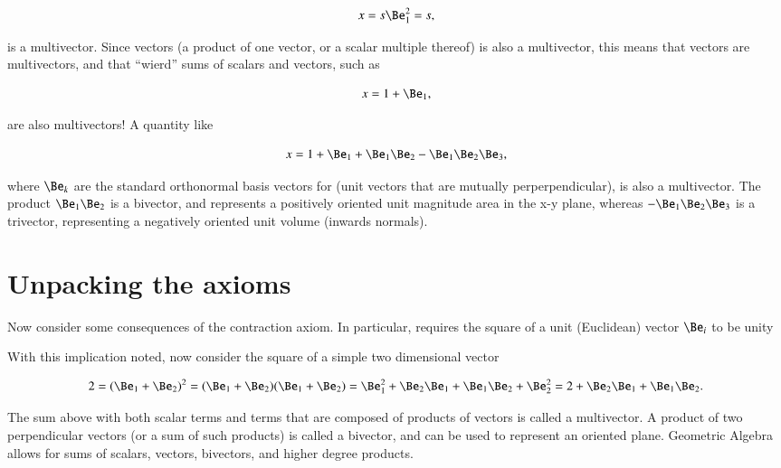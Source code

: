\begin{equation}\label{eqn:multivector:20}
   x = s \Be_1^2 = s,
\end{equation}

is a multivector.  Since vectors (a product of one vector, or a scalar multiple thereof) is also a multivector, this
means that vectors are multivectors, and that ``wierd'' sums of scalars and vectors, such as

\begin{dmath}\label{eqn:multivector:40}
   x = 1 + \Be_1,
\end{dmath}

are also multivectors!  A quantity like

\begin{dmath}\label{eqn:multivector:40}
   x = 1 + \Be_1 + \Be_1 \Be_2 - \Be_1 \Be_2 \Be_3,
\end{dmath}

where \( \Be_k \) are the standard orthonormal basis vectors for  (unit vectors that are mutually perperpendicular), is also a multivector.  The product \( \Be_1 \Be_2 \) is a bivector, and represents a positively oriented unit magnitude area in the x-y plane, whereas \( - \Be_1 \Be_2 \Be_3 \) is a trivector, representing a negatively oriented unit volume (inwards normals).

\section{Unpacking the axioms}
Now consider some consequences of the contraction axiom.  In particular,
requires the square of a unit (Euclidean) vector \( \Be_i \) to be unity


With this implication noted, now consider the square of a simple two dimensional vector

\begin{dmath}\label{eqn:gaTutorial:80}
2
=
(\Be_1 + \Be_2)^2
= (\Be_1 + \Be_2)(\Be_1 + \Be_2)
= \Be_1^2 + \Be_2 \Be_1 + \Be_1 \Be_2 + \Be_2^2
= 2 + \Be_2 \Be_1 + \Be_1 \Be_2.
\end{dmath}

The sum above with both scalar terms and terms that are composed of products of vectors is called a multivector.
A product of two perpendicular vectors (or a sum of such products) is called a bivector, and can be used to represent an oriented plane.
Geometric Algebra allows for sums of scalars, vectors, bivectors, and higher degree products.

